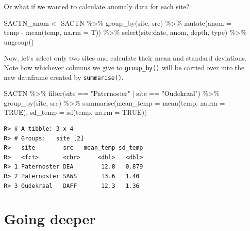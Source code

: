 \documentclass[
]{book}
\newenvironment{Shaded}{\begin{snugshade}}{\end{snugshade}}
\newcommand{\AttributeTok}[1]{\textcolor[rgb]{0.77,0.63,0.00}{#1}}
\newcommand{\ConstantTok}[1]{\textcolor[rgb]{0.00,0.00,0.00}{#1}}
\newcommand{\FunctionTok}[1]{\textcolor[rgb]{0.00,0.00,0.00}{#1}}
\newcommand{\NormalTok}[1]{#1}
\newcommand{\OtherTok}[1]{\textcolor[rgb]{0.56,0.35,0.01}{#1}}
\newcommand{\SpecialCharTok}[1]{\textcolor[rgb]{0.00,0.00,0.00}{#1}}
\newcommand{\StringTok}[1]{\textcolor[rgb]{0.31,0.60,0.02}{#1}}
\begin{document}
Or what if we wanted to calculate anomaly data for each site?

\begin{Shaded}
\begin{Highlighting}[]
\NormalTok{SACTN\_anom }\OtherTok{\textless{}{-}}\NormalTok{ SACTN }\SpecialCharTok{\%\textgreater{}\%}
  \FunctionTok{group\_by}\NormalTok{(site, src) }\SpecialCharTok{\%\textgreater{}\%} 
  \FunctionTok{mutate}\NormalTok{(}\AttributeTok{anom =}\NormalTok{ temp }\SpecialCharTok{{-}} \FunctionTok{mean}\NormalTok{(temp, }\AttributeTok{na.rm =}\NormalTok{ T)) }\SpecialCharTok{\%\textgreater{}\%} 
  \FunctionTok{select}\NormalTok{(site}\SpecialCharTok{:}\NormalTok{date, anom, depth, type) }\SpecialCharTok{\%\textgreater{}\%} 
  \FunctionTok{ungroup}\NormalTok{()}
\end{Highlighting}
\end{Shaded}

Now, let's select only two sites and calculate their mean and standard deviations. Note how whichever columns we give to \texttt{group\_by()} will be carried over into the new dataframe created by \texttt{summarise()}.

\begin{Shaded}
\begin{Highlighting}[]
\NormalTok{SACTN }\SpecialCharTok{\%\textgreater{}\%} 
  \FunctionTok{filter}\NormalTok{(site }\SpecialCharTok{==} \StringTok{"Paternoster"} \SpecialCharTok{|}\NormalTok{ site }\SpecialCharTok{==} \StringTok{"Oudekraal"}\NormalTok{) }\SpecialCharTok{\%\textgreater{}\%}
  \FunctionTok{group\_by}\NormalTok{(site, src) }\SpecialCharTok{\%\textgreater{}\%} 
  \FunctionTok{summarise}\NormalTok{(}\AttributeTok{mean\_temp =} \FunctionTok{mean}\NormalTok{(temp, }\AttributeTok{na.rm =} \ConstantTok{TRUE}\NormalTok{), }
            \AttributeTok{sd\_temp =} \FunctionTok{sd}\NormalTok{(temp, }\AttributeTok{na.rm =} \ConstantTok{TRUE}\NormalTok{))}
\end{Highlighting}
\end{Shaded}

\begin{verbatim}
R> # A tibble: 3 x 4
R> # Groups:   site [2]
R>   site        src   mean_temp sd_temp
R>   <fct>       <chr>     <dbl>   <dbl>
R> 1 Paternoster DEA        12.8   0.879
R> 2 Paternoster SAWS       13.6   1.40 
R> 3 Oudekraal   DAFF       12.3   1.36
\end{verbatim}

\hypertarget{going-deeper}{%
\section{Going deeper}\label{going-deeper}}
\end{document}
